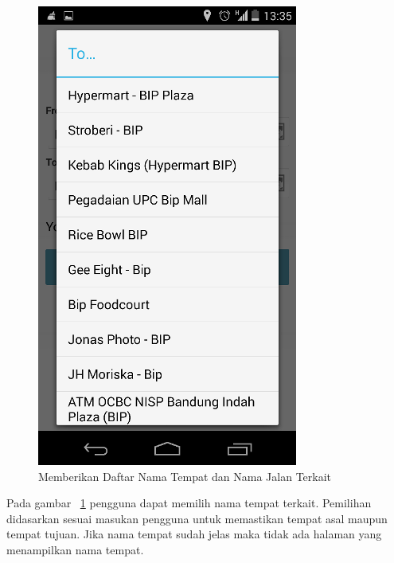 \begin{figure}[h]
	\centering
		\includegraphics[scale=0.5]{Gambar/KIRI_Android/terkait}
	\caption{Memberikan Daftar Nama Tempat dan Nama Jalan Terkait}
	\label{fig:terkait}
\end{figure}

Pada gambar ~\ref{fig:terkait} pengguna dapat memilih nama tempat terkait. Pemilihan didasarkan sesuai masukan pengguna untuk memastikan tempat asal maupun tempat tujuan. Jika nama tempat sudah jelas maka tidak ada halaman yang menampilkan nama tempat.

